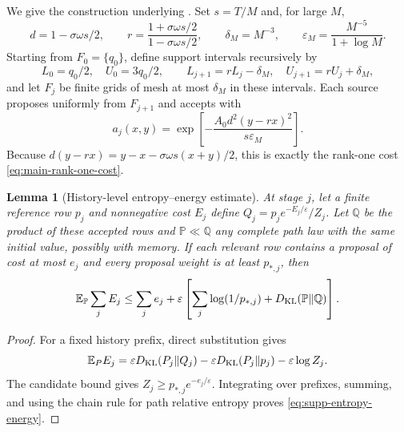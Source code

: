 \documentclass[11pt]{article}
\numberwithin{equation}{section}
\newtheorem{lemma}[lemma]{Lemma}
\theoremstyle{definition}
\theoremstyle{remark}
\begin{document}
We give the construction underlying
.  Set $s=T/M$ and, for large $M$,
\begin{equation}
 d=1-\sigma\omega s/2,\qquad
 r=\frac{1+\sigma\omega s/2}{1-\sigma\omega s/2},\qquad
 \delta_M=M^{-3},\qquad
 \varepsilon_M=\frac{M^{-5}}{1+\log M}.
 \label{eq:supp-explicit-scales}
\end{equation}
Starting from $F_0=\{q_0\}$, define support intervals recursively by
\[
 L_0=q_0/2,\quad U_0=3q_0/2,\qquad
 L_{j+1}=rL_j-\delta_M,\quad U_{j+1}=rU_j+\delta_M,
\]
and let $F_j$ be finite grids of mesh at most $\delta_M$ in these intervals.
Each source proposes uniformly from $F_{j+1}$ and accepts with
\begin{equation}
 a_j(x,y)=\exp\left[-\frac{A_0d^2(y-rx)^2}{s\varepsilon_M}\right].
 \label{eq:supp-explicit-acceptance}
\end{equation}
Because
$d(y-rx)=y-x-\sigma\omega s(x+y)/2$, this is exactly the rank-one cost
\eqref{eq:main-rank-one-cost}.

\begin{lemma}[History-level entropy--energy estimate]
\label{lem:supp-entropy-energy}
At stage $j$, let a finite reference row $p_j$ and nonnegative cost $E_j$ define
$Q_j=p_je^{-E_j/\varepsilon}/Z_j$.  Let $\mathbb Q$ be the product of these
accepted rows and $\mathbb P\ll\mathbb Q$ any complete path law with the same
initial value, possibly with memory.  If each relevant row contains a proposal
of cost at most $e_j$ and every proposal weight is at least $p_{*,j}$, then
\begin{equation}
 \mathbb E_{\mathbb P}\sum_jE_j
 \le\sum_je_j+\varepsilon\left[
 \sum_j\log(1/p_{*,j})+D_{\rm KL}(\mathbb P\Vert\mathbb Q)\right].
 \label{eq:supp-entropy-energy}
\end{equation}
\end{lemma}

\begin{proof}
For a fixed history prefix, direct substitution gives
\[
 \mathbb E_P E_j
 =\varepsilon D_{\rm KL}(P_j\Vert Q_j)
 -\varepsilon D_{\rm KL}(P_j\Vert p_j)-\varepsilon\log Z_j.
\]
The candidate bound gives
$Z_j\ge p_{*,j}e^{-e_j/\varepsilon}$.  Integrating over prefixes, summing, and
using the chain rule for path relative entropy proves
\eqref{eq:supp-entropy-energy}.
\end{proof}
\end{document}
